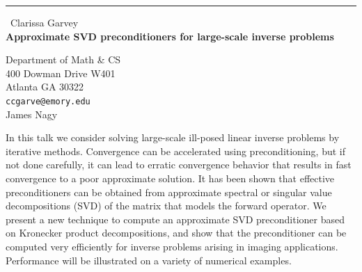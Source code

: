 \documentclass{report}
\begin{document}
\begin{center}
\rule{6in}{1pt} \
{\large Clarissa Garvey \\
{\bf Approximate SVD preconditioners for large-scale inverse problems}}

Department of Math \& CS \\ 400 Dowman Drive W401 \\ Atlanta GA 30322
\\
{\tt ccgarve@emory.edu}\\
James Nagy\end{center}

In this talk we consider solving large-scale ill-posed linear inverse
problems by iterative methods. Convergence can be accelerated using
preconditioning, but if not done carefully, it can lead to erratic
convergence behavior that results in fast convergence to a poor
approximate solution. It has been shown that effective preconditioners
can be obtained from approximate spectral or singular value
decompositions (SVD) of the matrix that models the forward operator. We
present a new technique to compute an approximate SVD preconditioner
based on Kronecker product decompositions, and show that the
preconditioner can be computed very efficiently for inverse problems
arising in imaging applications. Performance will be illustrated on a
variety of numerical examples.
\end{document}
